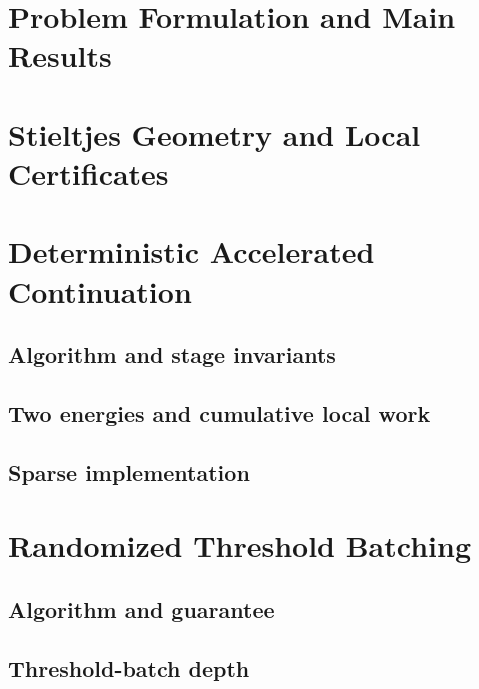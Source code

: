 \documentclass[pmlr,11pt,twoside]{jmlr}
\begin{document}
\section{Problem Formulation and Main Results}\label{sec:problem-formulation}


\section{Stieltjes Geometry and Local Certificates}\label{sec:obstacle-active-sets}


\section{Deterministic Accelerated Continuation}\label{sec:deterministic-method}
\subsection{Algorithm and stage invariants}\label{sec:deterministic-algorithm}


\subsection{Two energies and cumulative local work}\label{sec:deterministic-analysis}


\subsection{Sparse implementation}\label{sec:deterministic-implementation}


\section{Randomized Threshold Batching}\label{sec:randomized-method}
\subsection{Algorithm and guarantee}\label{sec:threshold-batch-algorithm}


\subsection{Threshold-batch depth}\label{sec:threshold-batch-depth}

\end{document}
